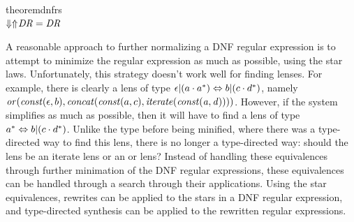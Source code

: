 \documentclass[numbers]{sigplanconf}
\begin{document}
\begin{restatable}{theorem}{dnfrs}\leavevmode\\
  \label{thm:soundness-dnf-lenses}
  $\Downarrow\Uparrow\mkern-4mu \mathit{DR} = \mathit{DR}$
\end{restatable}

A reasonable approach to further normalizing a DNF regular expression is to attempt to minimize the
regular expression as much as possible, using the star laws.
Unfortunately, this strategy doesn't work
well for finding lenses.  For example, there is clearly a lens of type
$\epsilon|(a\cdot{a}^*) \Leftrightarrow b|(c\cdot{d}^*)$,
namely $\mathit{or}(\mathit{const}(\epsilon,b),\mathit{concat}(\mathit{const}(a,c),\mathit{iterate(\mathit{const}(a,d))}))$.
However, if the system simplifies as much as possible, then it will have to find a lens
of type ${a}^* \Leftrightarrow b|(c\cdot{d}^*)$.
Unlike the type before being minified, where there was a type-directed way to find
this lens, there is no longer a type-directed way: should the lens be an iterate lens
or an or lens?
Instead of handling these equivalences through further minimation of the DNF
regular expressions, these equivalences can be handled through a search through
their applications.
Using the star equivalences, rewrites can be applied to the stars in a DNF
regular expression, and type-directed synthesis can be applied to the rewritten
regular expressions.
\end{document}
